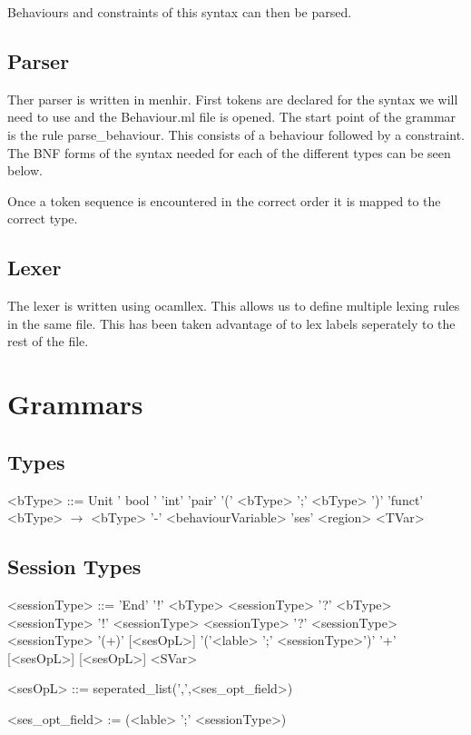 \documentclass[12pt]{article}
\begin{document}
Behaviours and constraints of this syntax can then be parsed. 

\subsection{Parser}

Ther parser is written in menhir. First tokens are declared for the syntax we will need to use and the Behaviour.ml file is opened. The start point of the grammar is the rule parse_behaviour. This consists of a behaviour followed by a constraint. The BNF forms of the syntax needed for each of the different types can be seen below. 

Once a token sequence is encountered in the correct order it is mapped to the correct type. 

\subsection{Lexer}

The lexer is written using ocamllex. This allows us to define multiple lexing rules in the same file. This has been taken advantage of to lex labels seperately to the rest of the file. 

\section {Grammars}

\subsection{Types}

\begin{grammar}

<bType> ::= Unit
\alt ' bool '
\alt 'int'
\alt 'pair' '(' <bType> ';' <bType> ')'
\alt 'funct' <bType> $\rightarrow$ <bType> '-' <behaviourVariable>
\alt 'ses' <region>
\alt <TVar>

\end{grammar}

\subsection{Session Types}

\begin{grammar}

<sessionType> ::= 'End'
\alt '!' <bType> <sessionType>
\alt '?' <bType> <sessionType>
\alt '!' <sessionType> <sessionType>
\alt '?' <sessionType> <sessionType>
\alt '(+)' [<sesOpL>] '('<lable> ';' <sessionType>')'
\alt '+' [<sesOpL>] [<sesOpL>]
\alt <SVar>

<sesOpL> ::= seperated_list(',',<ses_opt_field>)

<ses_opt_field> := (<lable> ';' <sessionType>)

\end{grammar}
\end{document}
